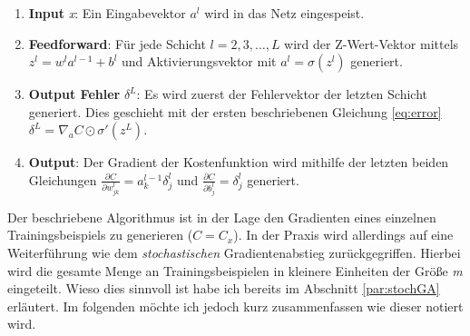 \begin{enumerate}

\item \textbf{Input} \emph{x}: Ein Eingabevektor $a^l$ wird in das Netz eingespeist. 

\item \textbf{Feedforward}: Für jede Schicht $l = 2, 3, \ldots, L$ wird der Z-Wert-Vektor mittels $z^{l} = w^l a^{l-1}+b^l$ und Aktivierungsvektor mit $a^{l} = \sigma(z^{l})$ generiert. 

\item \textbf{Output Fehler} $\delta^L$: Es wird zuerst der Fehlervektor der letzten Schicht generiert. Dies geschieht mit der ersten beschriebenen Gleichung \ref{eq:error} $\delta^{L}  = \nabla_a C \odot \sigma'(z^L)$. 

\item \textbf{Output}: Der Gradient der Kostenfunktion wird mithilfe der letzten beiden Gleichungen $\frac{\partial C}{\partial w^l_{jk}} = a^{l-1}_k \delta^l_j$ und $\frac{\partial C}{\partial b^l_j} = \delta^l_j$ generiert.

\end{enumerate} 

Der beschriebene Algorithmus ist in der Lage den Gradienten eines einzelnen Trainingsbeispiels zu generieren ($C=C_x$). In der Praxis wird allerdings auf eine Weiterführung wie dem \emph{stochastischen} Gradientenabstieg zurückgegriffen. Hierbei wird die gesamte Menge an Trainingsbeispielen in kleinere Einheiten der Größe \emph{m} eingeteilt. Wieso dies sinnvoll ist habe ich bereits im Abschnitt \ref{par:stochGA} erläutert. Im folgenden möchte ich jedoch kurz zusammenfassen wie dieser notiert wird. 


